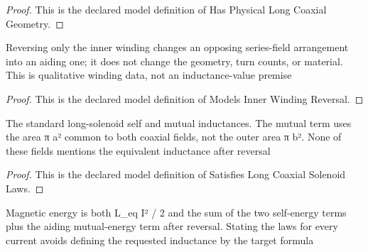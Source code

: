 \begin{proof}
  This is the declared model definition of Has Physical Long Coaxial Geometry.
\end{proof}
\begin{definition}
  \label{def:physics:phyx-mini-0990:phyxminiproblems-problemphyxmini0990-modelsinnerwindingreversal}
  Reversing only the inner winding changes an opposing series-field arrangement into an aiding one; it does not change the geometry, turn counts, or material. This is qualitative winding data, not an inductance-value premise
\end{definition}
\begin{proof}
  This is the declared model definition of Models Inner Winding Reversal.
\end{proof}
\begin{definition}
  \label{def:physics:phyx-mini-0990:phyxminiproblems-problemphyxmini0990-satisfieslongcoaxialsolenoidlaws}
  The standard long-solenoid self and mutual inductances. The mutual term uses the area π a² common to both coaxial fields, not the outer area π b². None of these fields mentions the equivalent inductance after reversal
\end{definition}
\begin{proof}
  This is the declared model definition of Satisfies Long Coaxial Solenoid Laws.
\end{proof}
\begin{definition}
  \label{def:physics:phyx-mini-0990:phyxminiproblems-problemphyxmini0990-satisfiesseriesmagneticenergylaws}
  Magnetic energy is both L\_eq I² / 2 and the sum of the two self-energy terms plus the aiding mutual-energy term after reversal. Stating the laws for every current avoids defining the requested inductance by the target formula
\end{definition}
